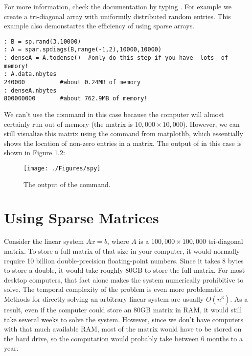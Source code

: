 For more information, check the documentation by typing . For example we create a tri-diagonal array with uniformily distributed random entries.  This example also demonstartes the efficiency of using sparse arrays.
\begin{lstlisting}[style=python]
: B = sp.rand(3,10000)
: A = spar.spdiags(B,range(-1,2),10000,10000)
: denseA = A.todense()  #only do this step if you have _lots_ of memory!
: A.data.nbytes
240000          #about 0.24MB of memory
: denseA.nbytes
800000000       #about 762.9MB of memory!
\end{lstlisting}


We can't use the  command in this case because the computer will almost certainly run out of memory (the matrix is $10,\!000 \times 10,\!000$). However, we can still visualize this matrix using the  command from matplotlib, which essentially shows the location of non-zero entries in a matrix. The output of  in this case is shown in Figure 1.2:

\begin{figure}[h!]
\begin{center}
\texttt{[image: ./Figures/spy]}
\end{center}
\caption{The output of the  command.}
\end{figure}

\section*{Using Sparse Matrices}

Consider the linear system $A x = b$, where $A$ is a
 $100,\!000\times 100,\!000$ tri-diagonal matrix.  To store a full
matrix of that size in your computer, it would normally require 10
billion double-precision floating-point numbers.  Since it takes 8
bytes to store a double, it would take roughly 80GB to store the
full matrix.  For most desktop computers, that fact alone makes the
system numerically prohibitive to solve. The temporal complexity of the problem is even more problematic. Methods for directly solving an arbitrary linear system are usually $O(n^3)$.  As
a result, even if the computer could store an 80GB matrix in RAM, it
would still take several weeks to solve the system.  However, since
we don't have computers with that much available RAM, most of the
matrix would have to be stored on the hard drive, so the computation
would probably take between $6$ months to a year.

